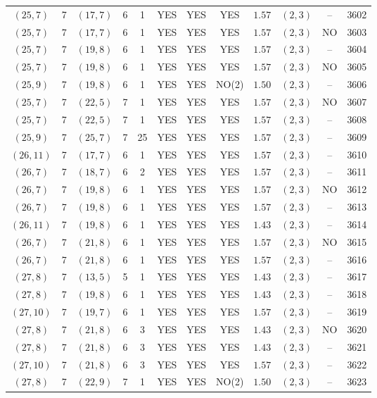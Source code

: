 \begin{longtable}{|c|c|c|c|c|c|c|c|c|c|c|c|}
$(25,7)$ & 7 & $(17,7)$ & 6 & 1 & YES & YES & YES & $1.57$ & $(2,3)$ & -- & 3602\\
$(25,7)$ & 7 & $(17,7)$ & 6 & 1 & YES & YES & YES & $1.57$ & $(2,3)$ & NO & 3603\\
$(25,7)$ & 7 & $(19,8)$ & 6 & 1 & YES & YES & YES & $1.57$ & $(2,3)$ & -- & 3604\\
$(25,7)$ & 7 & $(19,8)$ & 6 & 1 & YES & YES & YES & $1.57$ & $(2,3)$ & NO & 3605\\
$(25,9)$ & 7 & $(19,8)$ & 6 & 1 & YES & YES & NO(2) & $1.50$ & $(2,3)$ & -- & 3606\\
$(25,7)$ & 7 & $(22,5)$ & 7 & 1 & YES & YES & YES & $1.57$ & $(2,3)$ & NO & 3607\\
$(25,7)$ & 7 & $(22,5)$ & 7 & 1 & YES & YES & YES & $1.57$ & $(2,3)$ & -- & 3608\\
$(25,9)$ & 7 & $(25,7)$ & 7 & 25 & YES & YES & YES & $1.57$ & $(2,3)$ & -- & 3609\\
$(26,11)$ & 7 & $(17,7)$ & 6 & 1 & YES & YES & YES & $1.57$ & $(2,3)$ & -- & 3610\\
$(26,7)$ & 7 & $(18,7)$ & 6 & 2 & YES & YES & YES & $1.57$ & $(2,3)$ & -- & 3611\\
$(26,7)$ & 7 & $(19,8)$ & 6 & 1 & YES & YES & YES & $1.57$ & $(2,3)$ & NO & 3612\\
$(26,7)$ & 7 & $(19,8)$ & 6 & 1 & YES & YES & YES & $1.57$ & $(2,3)$ & -- & 3613\\
$(26,11)$ & 7 & $(19,8)$ & 6 & 1 & YES & YES & YES & $1.43$ & $(2,3)$ & -- & 3614\\
$(26,7)$ & 7 & $(21,8)$ & 6 & 1 & YES & YES & YES & $1.57$ & $(2,3)$ & NO & 3615\\
$(26,7)$ & 7 & $(21,8)$ & 6 & 1 & YES & YES & YES & $1.57$ & $(2,3)$ & -- & 3616\\
$(27,8)$ & 7 & $(13,5)$ & 5 & 1 & YES & YES & YES & $1.43$ & $(2,3)$ & -- & 3617\\
$(27,8)$ & 7 & $(19,8)$ & 6 & 1 & YES & YES & YES & $1.43$ & $(2,3)$ & -- & 3618\\
$(27,10)$ & 7 & $(19,7)$ & 6 & 1 & YES & YES & YES & $1.57$ & $(2,3)$ & -- & 3619\\
$(27,8)$ & 7 & $(21,8)$ & 6 & 3 & YES & YES & YES & $1.43$ & $(2,3)$ & NO & 3620\\
$(27,8)$ & 7 & $(21,8)$ & 6 & 3 & YES & YES & YES & $1.43$ & $(2,3)$ & -- & 3621\\
$(27,10)$ & 7 & $(21,8)$ & 6 & 3 & YES & YES & YES & $1.57$ & $(2,3)$ & -- & 3622\\
$(27,8)$ & 7 & $(22,9)$ & 7 & 1 & YES & YES & NO(2) & $1.50$ & $(2,3)$ & -- & 3623\\

\end{longtable}
